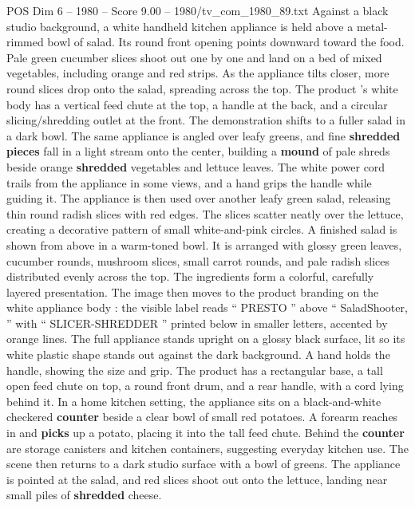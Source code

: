\begin{textsample}{POS Dim 6 – 1980 – Score 9.00 – 1980/tv\_com\_1980\_89.txt}  \label{ex:f6_pos_040}
Against a black studio background, a white handheld kitchen appliance is held above a metal-rimmed bowl of salad.
Its round front opening points downward toward the food.
Pale green cucumber slices shoot out one by one and land on a bed of mixed vegetables, including orange and red strips.
As the appliance tilts closer, more round slices drop onto the salad, spreading across the top.
The product ’s white body has a vertical feed chute at the top, a handle at the back, and a circular slicing/shredding outlet at the front.
The demonstration shifts to a fuller salad in a dark bowl.
The same appliance is angled over leafy greens, and fine \textbf{shredded} \textbf{pieces} fall in a light stream onto the center, building a \textbf{mound} of pale shreds beside orange \textbf{shredded} vegetables and lettuce leaves.
The white power cord trails from the appliance in some views, and a hand grips the handle while guiding it.
The appliance is then used over another leafy green salad, releasing thin round radish slices with red edges.
The slices scatter neatly over the lettuce, creating a decorative pattern of small white-and-pink circles.
A finished salad is shown from above in a warm-toned bowl.
It is arranged with glossy green leaves, cucumber rounds, mushroom slices, small carrot rounds, and pale radish slices distributed evenly across the top.
The ingredients form a colorful, carefully layered presentation.
The image then moves to the product branding on the white appliance body : the visible label reads “ PRESTO ” above “ SaladShooter, ” with “ SLICER-SHREDDER ” printed below in smaller letters, accented by orange lines.
The full appliance stands upright on a glossy black surface, lit so its white plastic shape stands out against the dark background.
A hand holds the handle, showing the size and grip.
The product has a rectangular base, a tall open feed chute on top, a round front drum, and a rear handle, with a cord lying behind it.
In a home kitchen setting, the appliance sits on a black-and-white checkered \textbf{counter} beside a clear bowl of small red potatoes.
A forearm reaches in and \textbf{picks} up a potato, placing it into the tall feed chute.
Behind the \textbf{counter} are storage canisters and kitchen containers, suggesting everyday kitchen use.
The scene then returns to a dark studio surface with a bowl of greens.
The appliance is pointed at the salad, and red slices shoot out onto the lettuce, landing near small piles of \textbf{shredded} cheese.

\end{textsample}
